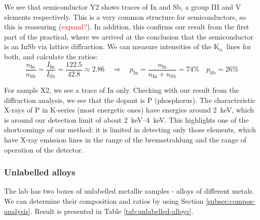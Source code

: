 \documentclass[11pt,a4paper,twoside,onecolumn]{article}
\newcommand{\reminder}[1]{\textcolor{red}{#1}}
\newcommand{\Kalpha}{$\mathrm{K}_\alpha$~}
\begin{document}
We see that semiconductor Y2 shows traces of In and Sb, a group III and V elements respectively. This is a very common structure for semiconductors, so this is reassuring (\reminder{expand?}). In addition, this confirms our result from the first part of the practical, where we arrived at the conclusion that the semiconductor is an InSb via lattice diffraction. We can measure intensities of the \Kalpha lines for both, and calculate the ratios:
\begin{equation}
    \frac{n_\mathrm{In}}{n_\mathrm{Sb}} = \frac{I_\mathrm{In}}{I_\mathrm{Sb}} = \frac{122.5}{42.8} \approx 2.86 \quad \Rightarrow \quad p_\mathrm{In} = \frac{n_\mathrm{In}}{n_\mathrm{In}+n_\mathrm{Sb}} = 74 \% \quad p_\mathrm{Sb} = 26 \%
\end{equation}

For sample X2, we see a trace of In only. Checking with our result from the diffraction analysis, we see that the dopant is P (phosphorus). The characteristic X-rays of P in K-series (most energetic ones) have energies around \qty{2}{keV}, which is around our detection limit of about \qtyrange{2}{4}{keV}. This highlights one of the shortcomings of our method: it is limited in detecting only those elements, which have X-ray emission lines in the range of the bremsstrahlung and the range of operation of the detector.

\subsubsection{Unlabelled alloys}\label{subsubsec:unlabelled-alloys}
The lab has two boxes of unlabelled metallic samples - alloys of different metals. We can determine their composition and ratios by using Section \ref{subsec:compos-analysis}. Result is presented in Table \ref{tab:unlabelled-alloys}.
\end{document}
